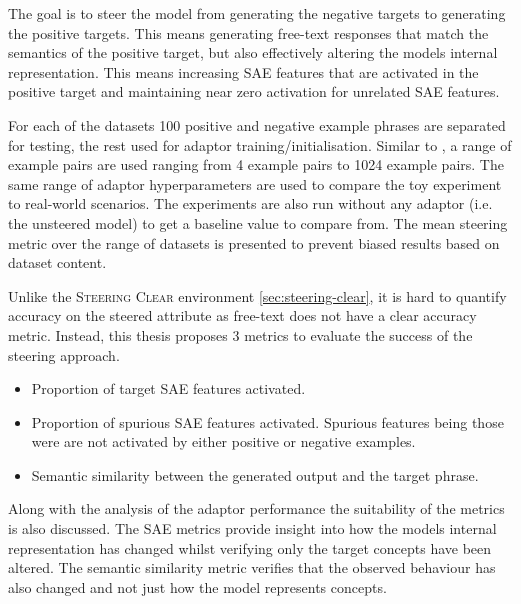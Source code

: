 The goal is to steer the model from generating the negative targets to generating the positive targets.
This means generating free-text responses that match the semantics of the positive target, but also effectively altering the models internal representation.
This means increasing SAE features that are activated in the positive target and maintaining near zero activation for unrelated SAE features.

For each of the datasets 100 positive and negative example phrases are separated for testing, the rest used for adaptor training/initialisation.
Similar to \citet{steering-clear}, a range of example pairs are used ranging from 4 example pairs to 1024 example pairs.
The same range of adaptor hyperparameters are used to compare the toy experiment to real-world scenarios.
The experiments are also run without any adaptor (i.e. the unsteered model) to get a baseline value to compare from.
The mean steering metric over the range of datasets is presented to prevent biased results based on dataset content.

 Unlike the {\scshape Steering Clear} environment \cref{sec:steering-clear}, it is hard to quantify accuracy on the steered attribute as free-text does not have a clear accuracy metric.
Instead, this thesis proposes 3 metrics to evaluate the success of the steering approach.
\begin{itemize}[nolistsep]
    \item Proportion of target SAE features activated.
    \item Proportion of spurious SAE features activated. Spurious features being those were are not activated by either positive or negative examples.
    \item Semantic similarity between the generated output and the target phrase.
\end{itemize}
Along with the analysis of the adaptor performance the suitability of the metrics is also discussed.
The SAE metrics provide insight into how the models internal representation has changed whilst verifying only the target concepts have been altered.
The semantic similarity metric verifies that the observed behaviour has also changed and not just how the model represents concepts.


